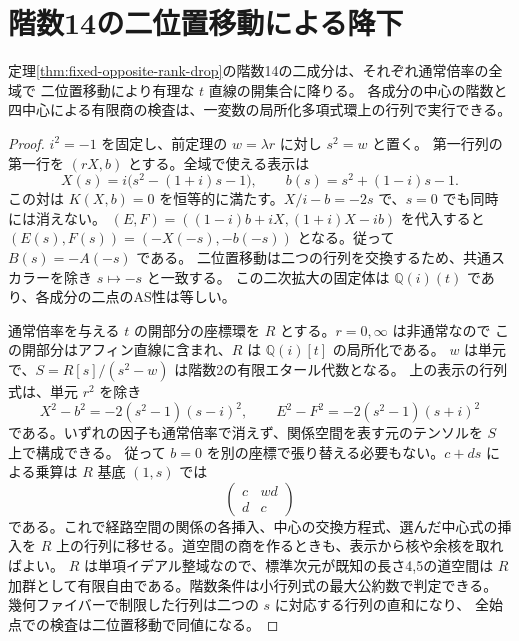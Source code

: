 \section{階数14の二位置移動による降下}
\label{sec:rank-fourteen-descent}
\begin{proposition}\label{prop:rank-fourteen-descent}
定理\ref{thm:fixed-opposite-rank-drop}の階数14の二成分は、それぞれ通常倍率の全域で
二位置移動により有理な $t$ 直線の開集合に降りる。
各成分の中心の階数と四中心による有限商の検査は、一変数の局所化多項式環上の行列で実行できる。
\end{proposition}
\begin{proof}
$i^2=-1$ を固定し、前定理の $w=\lambda r$ に対し $s^2=w$ と置く。
第一行列の第一行を $(rX,b)$ とする。全域で使える表示は
\[
 X(s)=i\big(s^2-(1+i)s-1\big),\qquad b(s)=s^2+(1-i)s-1 .
\]
この対は $K(X,b)=0$ を恒等的に満たす。$X/i-b=-2s$ で、$s=0$ でも同時には消えない。
$(E,F)=((1-i)b+iX,(1+i)X-ib)$ を代入すると
$(E(s),F(s))=(-X(-s),-b(-s))$ となる。従って $B(s)=-A(-s)$ である。
二位置移動は二つの行列を交換するため、共通スカラーを除き $s\mapsto-s$ と一致する。
この二次拡大の固定体は $\mathbb Q(i)(t)$ であり、各成分の二点のAS性は等しい。

通常倍率を与える $t$ の開部分の座標環を $R$ とする。$r=0,\infty$ は非通常なので
この開部分はアフィン直線に含まれ、$R$ は $\mathbb Q(i)[t]$ の局所化である。
$w$ は単元で、$S=R[s]/(s^2-w)$ は階数2の有限エタール代数となる。
上の表示の行列式は、単元 $r^2$ を除き
\[
 X^2-b^2=-2(s^2-1)(s-i)^2,\qquad E^2-F^2=-2(s^2-1)(s+i)^2
\]
である。いずれの因子も通常倍率で消えず、関係空間を表す元のテンソルを $S$ 上で構成できる。
従って $b=0$ を別の座標で張り替える必要もない。$c+ds$ による乗算は $R$ 基底 $(1,s)$ では
\[
 \begin{pmatrix}c&wd\\d&c\end{pmatrix}
\]
である。これで経路空間の関係の各挿入、中心の交換方程式、選んだ中心式の挿入を
$R$ 上の行列に移せる。道空間の商を作るときも、表示から核や余核を取ればよい。
$R$ は単項イデアル整域なので、標準次元が既知の長さ4,5の道空間は
$R$ 加群として有限自由である。階数条件は小行列式の最大公約数で判定できる。
幾何ファイバーで制限した行列は二つの $s$ に対応する行列の直和になり、
全始点での検査は二位置移動で同値になる。
\end{proof}

